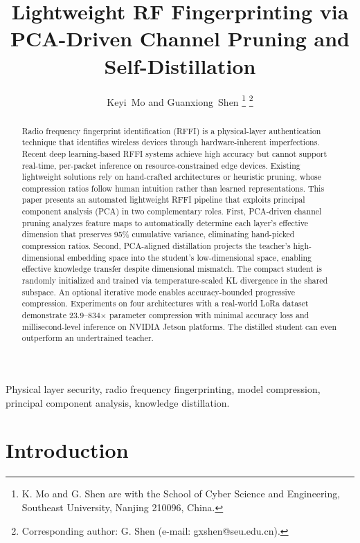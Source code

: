 \documentclass[journal,comsoc]{IEEEtran}
\begin{document}
\title{Lightweight RF Fingerprinting via PCA-Driven Channel Pruning and Self-Distillation}

\author{Keyi~Mo and Guanxiong~Shen%
\thanks{K. Mo and G. Shen are with the School of Cyber Science and Engineering, Southeast University, Nanjing 210096, China.}%
\thanks{Corresponding author: G. Shen (e-mail: gxshen@seu.edu.cn).}%
}

\maketitle


\begin{abstract}
Radio frequency fingerprint identification (RFFI) is a physical-layer authentication technique that identifies wireless devices through hardware-inherent imperfections. Recent deep learning-based RFFI systems achieve high accuracy but cannot support real-time, per-packet inference on resource-constrained edge devices. Existing lightweight solutions rely on hand-crafted architectures or heuristic pruning, whose compression ratios follow human intuition rather than learned representations. This paper presents an automated lightweight RFFI pipeline that exploits principal component analysis (PCA) in two complementary roles. First, PCA-driven channel pruning analyzes feature maps to automatically determine each layer's effective dimension that preserves 95\% cumulative variance, eliminating hand-picked compression ratios. Second, PCA-aligned distillation projects the teacher's high-dimensional embedding space into the student's low-dimensional space, enabling effective knowledge transfer despite dimensional mismatch. The compact student is randomly initialized and trained via temperature-scaled KL divergence in the shared subspace. An optional iterative mode enables accuracy-bounded progressive compression. Experiments on four architectures with a real-world LoRa dataset demonstrate 23.9--834$\times$ parameter compression with minimal accuracy loss and millisecond-level inference on NVIDIA Jetson platforms. The distilled student can even outperform an undertrained teacher.
\end{abstract}


\begin{IEEEkeywords}
Physical layer security, radio frequency fingerprinting, model compression, principal component analysis, knowledge distillation.
\end{IEEEkeywords}


\section{Introduction}
\end{document}
